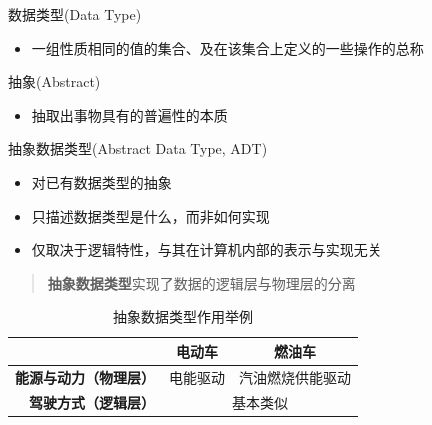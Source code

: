 \begin{frame}{\insertsubsectionhead}
    \begin{block}{数据类型(Data Type)}
        \begin{itemize}
            \item 一组性质相同的值的\alert{集合}、及在该集合上定义的一些\alert{操作}的总称
        \end{itemize}
    \end{block}
    \pause
    \begin{block}{抽象(Abstract)}
        \begin{itemize}
            \item 抽取出事物具有的\alert{普遍性}的本质
        \end{itemize}
    \end{block}
    \pause
    \begin{block}{抽象数据类型(Abstract Data Type, ADT)}
        \begin{itemize}
            \item 对已有数据类型的抽象
            \item 只描述数据类型\alert{是什么}，而非如何实现
            \item 仅取决于\alert{逻辑特性}，与其在计算机内部的表示与实现\footnotemark{}无关
        \end{itemize}
    \end{block}
\end{frame}

\begin{frame}{\insertsubsectionhead}
    \begin{quote}
        \textbf{抽象数据类型}实现了数据的\alert{逻辑层}与\alert{物理层}的分离
    \end{quote}
    \pause
    \begin{table}[h]
        \small
        \centering
        \caption{抽象数据类型作用举例}
        \begin{tabular}{rcc}
            \toprule
                                        & \textbf{电动车}             & \textbf{燃油车} \\
            \midrule
            \textbf{能源与动力（\alert{物理层}）} & 电能驱动                     & 汽油燃烧供能驱动     \\
            \textbf{驾驶方式（\alert{逻辑层}）}  & \multicolumn{2}{c}{基本类似}                \\
            \bottomrule
        \end{tabular}
        \label{tab:ele_gas}
    \end{table}
\end{frame}

